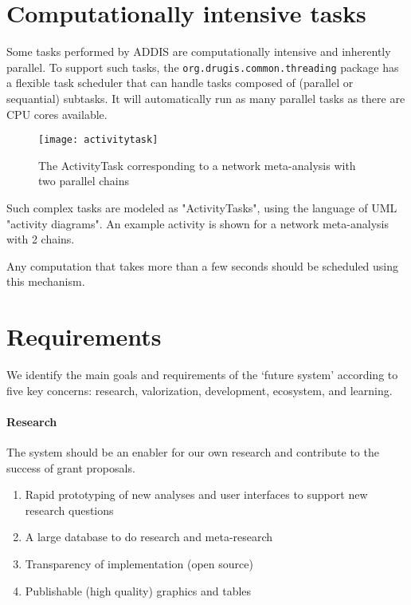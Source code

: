 \documentclass[a4paper]{article}
\begin{document}
\section{Computationally intensive tasks}

Some tasks performed by ADDIS are computationally intensive and inherently parallel.
To support such tasks, the {\tt org.drugis.common.threading} package has a flexible task scheduler that can handle tasks composed of (parallel or sequantial) subtasks.
It will automatically run as many parallel tasks as there are CPU cores available.

\begin{figure}[h]
\centering
\texttt{[image: activitytask]}
\caption{The ActivityTask corresponding to a network meta-analysis with two parallel chains}
\end{figure}

Such complex tasks are modeled as "ActivityTasks", using the language of UML "activity diagrams".
An example activity is shown for a network meta-analysis with 2 chains.

Any computation that takes more than a few seconds should be scheduled using this mechanism.

\clearpage

\appendix

\section{Requirements}

We identify the main goals and requirements of the `future system' according to five key concerns: research, valorization, development, ecosystem, and learning.

\paragraph{Research}
The system should be an enabler for our own research and contribute to the success of grant proposals.
\begin{enumerate}[label=R\arabic*]
\item\label{rPrototyping} Rapid prototyping of new analyses and user interfaces to support new research questions
\item\label{rDatabase} A large database to do research and meta-research
\item\label{rTransparency} Transparency of implementation (open source)
\item\label{rPublishable} Publishable (high quality) graphics and tables 
\end{enumerate}
\end{document}
